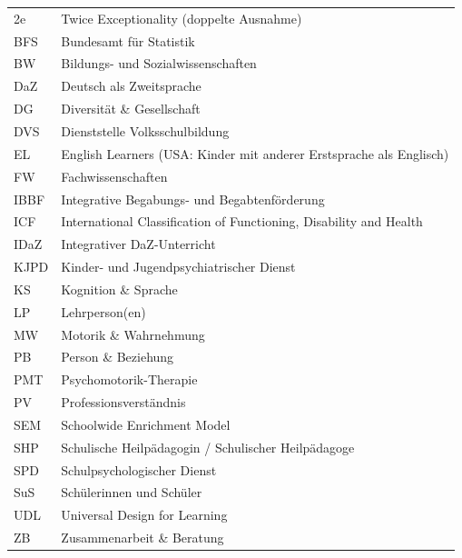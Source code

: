 \documentclass[ngerman, a4paper]{article}
\begin{document}
\begin{tabular}{@{}ll@{}}
  2e   & Twice Exceptionality (doppelte Ausnahme)                            \\
  BFS  & Bundesamt für Statistik                                             \\
  BW   & Bildungs- und Sozialwissenschaften                                  \\
  DaZ  & Deutsch als Zweitsprache                                            \\
  DG   & Diversität \& Gesellschaft                                          \\
  DVS  & Dienststelle Volksschulbildung                                      \\
  EL   & English Learners (USA: Kinder mit anderer Erstsprache als Englisch) \\
  FW   & Fachwissenschaften                                                  \\
  IBBF & Integrative Begabungs- und Begabtenförderung                        \\
  ICF  & International Classification of Functioning, Disability and Health  \\
  IDaZ & Integrativer DaZ-Unterricht                                         \\
  KJPD & Kinder- und Jugendpsychiatrischer Dienst                            \\
  KS   & Kognition \& Sprache                                                \\
  LP   & Lehrperson(en)                                                      \\
  MW   & Motorik \& Wahrnehmung                                              \\
  PB   & Person \& Beziehung                                                 \\
  PMT  & Psychomotorik-Therapie                                              \\
  PV   & Professionsverständnis                                              \\
  SEM  & Schoolwide Enrichment Model                                         \\
  SHP  & Schulische Heilpädagogin / Schulischer Heilpädagoge                 \\
  SPD  & Schulpsychologischer Dienst                                         \\
  SuS  & Schülerinnen und Schüler                                            \\
  UDL  & Universal Design for Learning                                       \\
  ZB   & Zusammenarbeit \& Beratung                                          \\
\end{tabular}
\end{document}
